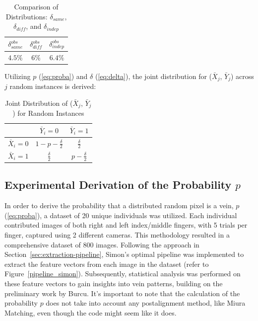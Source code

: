 \begin{table}[H]
    \centering
    \renewcommand{\arraystretch}{1.25}\begin{tabular}{|c|c|c|}
        \hline
        $\delta_{same}^{obs}$ & $\delta_{diff}^{obs}$ & $\delta_{indep}^{obs}$\\
        \hline
        $4.5\%$ & $6\%$ & $6.4\%$\\
        \hline
    \end{tabular}
\caption{Comparison of Distributions: $\delta_{same}$, $\delta_{diff}$, and $\delta_{indep}$}
\end{table}

Utilizing $p$ (\ref{eq:proba}) and $\delta$ (\ref{eq:delta}), the joint distribution for (\(\bar{X}_j\), \(\bar{Y}_j\)) across \(j\) random instances is derived:

\begin{table}[H]
    \centering
    \renewcommand{\arraystretch}{1.5}
    \begin{tabular}{|c|c|c|}
        \hline
        & $\bar{Y}_i = 0$ & $\bar{Y}_i = 1$\\
        \hline
        $\bar{X}_i = 0$ & $1 - p - \frac{\delta}{2}$ & $\frac{\delta}{2}$\\
        \hline
        $\bar{X}_i = 1$ & $\frac{\delta}{2}$ & $p - \frac{\delta}{2}$\\
        \hline
    \end{tabular}
    \caption{Joint Distribution of ($\bar{X}_j$, $\bar{Y}_j$) for Random Instances}
    \label{tab:joint_distribution}
\end{table}

\subsection{Experimental Derivation of the Probability \(p\)}

In order to derive the probability that a distributed random pixel is a vein, $p$ (\ref{eq:proba}), a dataset of 20 unique individuals was utilized. Each individual contributed images of both right and left index/middle fingers, with 5 trials per finger, captured using 2 different cameras. This methodology resulted in a comprehensive dataset of 800 images. Following the approach in Section~\ref{sec:extraction-pipeline}, Simon's optimal pipeline was implemented to extract the feature vectors from each image in the dataset (refer to Figure~\ref{pipeline_simon}). Subsequently, statistical analysis was performed on these feature vectors to gain insights into vein patterns, building on the preliminary work by Burcu. It's important to note that the calculation of the probability \(p\) does not take into account any postalignment method, like Miura Matching, even though the code might seem like it does.

